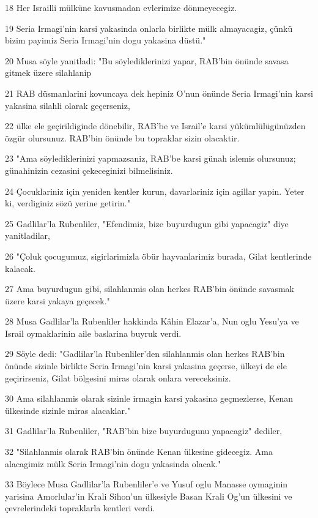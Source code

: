 \par 18 Her Israilli mülküne kavusmadan evlerimize dönmeyecegiz.
\par 19 Seria Irmagi'nin karsi yakasinda onlarla birlikte mülk almayacagiz, çünkü bizim payimiz Seria Irmagi'nin dogu yakasina düstü."
\par 20 Musa söyle yanitladi: "Bu söylediklerinizi yapar, RAB'bin önünde savasa gitmek üzere silahlanip
\par 21 RAB düsmanlarini kovuncaya dek hepiniz O'nun önünde Seria Irmagi'nin karsi yakasina silahli olarak geçerseniz,
\par 22 ülke ele geçirildiginde dönebilir, RAB'be ve Israil'e karsi yükümlülügünüzden özgür olursunuz. RAB'bin önünde bu topraklar sizin olacaktir.
\par 23 "Ama söylediklerinizi yapmazsaniz, RAB'be karsi günah islemis olursunuz; günahinizin cezasini çekeceginizi bilmelisiniz.
\par 24 Çocuklariniz için yeniden kentler kurun, davarlariniz için agillar yapin. Yeter ki, verdiginiz sözü yerine getirin."
\par 25 Gadlilar'la Rubenliler, "Efendimiz, bize buyurdugun gibi yapacagiz" diye yanitladilar,
\par 26 "Çoluk çocugumuz, sigirlarimizla öbür hayvanlarimiz burada, Gilat kentlerinde kalacak.
\par 27 Ama buyurdugun gibi, silahlanmis olan herkes RAB'bin önünde savasmak üzere karsi yakaya geçecek."
\par 28 Musa Gadlilar'la Rubenliler hakkinda Kâhin Elazar'a, Nun oglu Yesu'ya ve Israil oymaklarinin aile baslarina buyruk verdi.
\par 29 Söyle dedi: "Gadlilar'la Rubenliler'den silahlanmis olan herkes RAB'bin önünde sizinle birlikte Seria Irmagi'nin karsi yakasina geçerse, ülkeyi de ele geçirirseniz, Gilat bölgesini miras olarak onlara vereceksiniz.
\par 30 Ama silahlanmis olarak sizinle irmagin karsi yakasina geçmezlerse, Kenan ülkesinde sizinle miras alacaklar."
\par 31 Gadlilar'la Rubenliler, "RAB'bin bize buyurdugunu yapacagiz" dediler,
\par 32 "Silahlanmis olarak RAB'bin önünde Kenan ülkesine gidecegiz. Ama alacagimiz mülk Seria Irmagi'nin dogu yakasinda olacak."
\par 33 Böylece Musa Gadlilar'la Rubenliler'e ve Yusuf oglu Manasse oymaginin yarisina Amorlular'in Krali Sihon'un ülkesiyle Basan Krali Og'un ülkesini ve çevrelerindeki topraklarla kentleri verdi.
